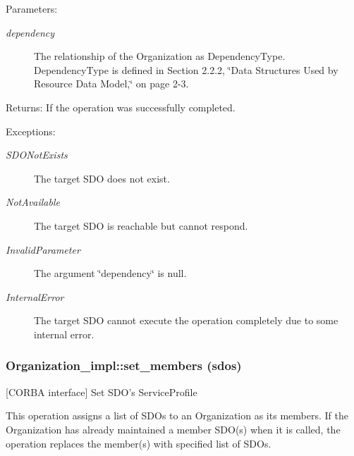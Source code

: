 \begin{Desc}
\item[Parameters:]
\begin{description}
\item[{\em dependency}]The relationship of the Organization as Dependency\-Type. Dependency\-Type is defined in Section 2.2.2, \char`\"{}Data Structures Used by Resource Data Model,\char`\"{} on page 2-3. \end{description}
\end{Desc}
\begin{Desc}
\item[Returns:]If the operation was successfully completed. \end{Desc}
\begin{Desc}
\item[Exceptions:]
\begin{description}
\item[{\em SDONot\-Exists}]The target SDO does not exist. \item[{\em Not\-Available}]The target SDO is reachable but cannot respond. \item[{\em Invalid\-Parameter}]The argument \char`\"{}dependency\char`\"{} is null. \item[{\em Internal\-Error}]The target SDO cannot execute the operation completely due to some internal error.\end{description}
\end{Desc}
\subsubsection{\setlength{\rightskip}{0pt plus 5cm}Organization\_\-impl::set\_\-members (sdos)}\label{classOrganization__impl_Organization__impla9}


[CORBA interface] Set SDO's Service\-Profile 

This operation assigns a list of SDOs to an Organization as its members. If the Organization has already maintained a member SDO(s) when it is called, the operation replaces the member(s) with specified list of SDOs.

